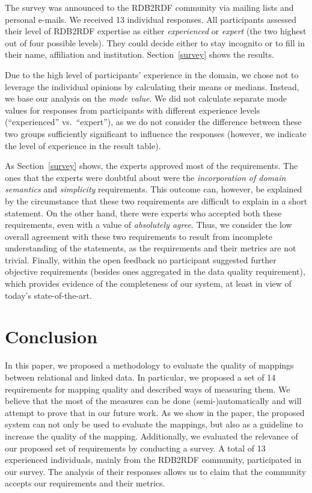 The survey was announced to the RDB2RDF community via mailing lists and personal e-mails.
We received 13 individual responses.
All participants assessed their level of RDB2RDF expertise as either \textit{experienced} or \textit{expert} (the two highest out of four possible levels).
They could decide either to stay incognito or to fill in their name, affiliation and institution.
Section~\ref{survey} shows the results.

Due to the high level of participants' experience in the domain, we chose not to leverage the individual opinions by calculating their means or medians. 
Instead, we base our analysis on the \emph{mode value}.
We did not calculate separate mode values for responses from participants with different experience levels (``experienced'' vs.\ ``expert''), as we do not consider the difference between these two groups sufficiently significant to influence the responses (however, we indicate the level of experience in the result table).  

As Section~\ref{survey} shows, the experts approved most of the requirements. 
The ones that the experts were doubtful about were the \emph{incorporation of domain semantics} and \emph{simplicity} requirements.
This outcome can, however, be explained by the circumstance that these two requirements are difficult to explain in a short statement. 
On the other hand, there were experts who accepted both these requirements, even with a value of \emph{absolutely agree}.
Thus, we consider the low overall agreement with these two requirements to result from incomplete understanding of the statements, as the requirements and their metrics are not trivial.
Finally, within the open feedback no participant suggested further objective requirements (besides ones aggregated in the data quality requirement), which provides evidence of the completeness of our system, at least in view of today's state-of-the-art.

\section{Conclusion}
\label{conclusions}
In this paper, we proposed a methodology to evaluate the quality of mappings between relational and linked data. 
In particular, we proposed a set of 14 requirements for mapping quality and described ways of measuring them.
We believe that the most of the measures can be done (semi-)automatically and will attempt to prove that in our future work.
As we show in the paper, the proposed system can not only be used to evaluate the mappings, but also as a guideline to increase the quality of the mapping.
Additionally, we evaluated the relevance of our proposed set of requirements by conducting a survey. 
A total of 13 experienced individuals, mainly from the RDB2RDF community, participated in our survey.  The analysis of their responses allows us to claim that the community accepts our requirements and their metrics.

